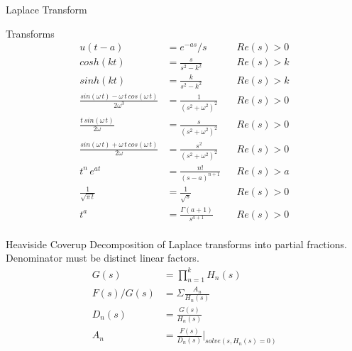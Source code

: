 \begin{section}{Laplace Transform}
\begin{subsection}{Transforms}
\begin{align*}
      u(t-a)&= e^{-as}/s && Re(s) > 0\\
      cosh(kt) &= \frac{s}{s^2-k^2} && Re(s) > k\\
      sinh(kt) &= \frac{k}{s^2-k^2} && Re(s) > k\\
      \frac{sin(\omega\,t)-\omega\,t\,cos(\omega\,t)}{2\omega^3}
           &= \frac{1}{(s^2+\omega^2)^2} && Re(s) > 0\\
      \frac{t\,sin(\omega\,t)}{2\omega}
           &= \frac{s}{(s^2+\omega^2)^2} && Re(s) > 0\\
      \frac{sin(\omega\,t)+\omega\,t\,cos(\omega\,t)}{2\omega}
           &= \frac{s^2}{(s^2+\omega^2)^2} && Re(s) > 0\\
      t^n\,e^{at} &= \frac{n!}{(s-a)^{n+1}} && Re(s) > a\\
      \frac{1}{\sqrt{\pi\,t}} &= \frac{1}{\sqrt{s}} && Re(s) > 0\\
      t^a &= \frac{\Gamma(a+1)}{s^{a+1}} && Re(s) > 0\\
    \end{align*}
  \end{subsection}
  \begin{subsection}{Heaviside Coverup}
    Decomposition of Laplace transforms into partial
    fractions. Denominator must be distinct linear factors.
    \begin{align*}
      G(s) &= \prod\limits_{n=1}^{k} H_n(s)\\
      F(s)/G(s) &= \Sigma \frac{A_n}{H_{n}(s)}\\
      D_{n}(s) &=\frac{G(s)}{H_n(s)}\\
      A_n &= \frac{F(s)}{D_{n}(s)} \biggr\rvert_{solve(s,H_{n}(s)=0)}\\
    \end{align*}
  \end{subsection}
\end{section}
